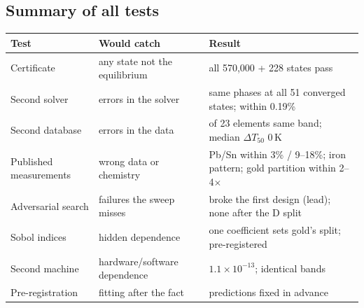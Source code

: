 \documentclass[11pt,a4paper]{article}
\begin{document}
\subsection{Summary of all tests}
\begin{center}
\small
\begin{tabular}{@{}>{\raggedright\arraybackslash}p{3.4cm}>{\raggedright\arraybackslash}p{4.2cm}>{\raggedright\arraybackslash}p{6.8cm}@{}}
\toprule
\textbf{Test} & \textbf{Would catch} & \textbf{Result} \\
\midrule
Certificate & any state not the equilibrium & all 570,000 + 228 states pass \\
Second solver & errors in the solver & same phases at all 51 converged states; within 0.19\% \\
Second database & errors in the data & 21 of 23 elements same band; median $\Delta T_{50}$ 0\,K \\
Published measurements & wrong data or chemistry & Pb/Sn within 3\% / 9--18\%; iron pattern; gold partition within 2--4$\times$ \\
Adversarial search & failures the sweep misses & broke the first design (lead); none after the D split \\
Sobol indices & hidden dependence & one coefficient sets gold's split; pre-registered \\
Second machine & hardware/software dependence & $1.1\times10^{-13}$; identical bands \\
Pre-registration & fitting after the fact & 13 predictions fixed in advance \\
\bottomrule
\end{tabular}
\end{center}

\end{document}
